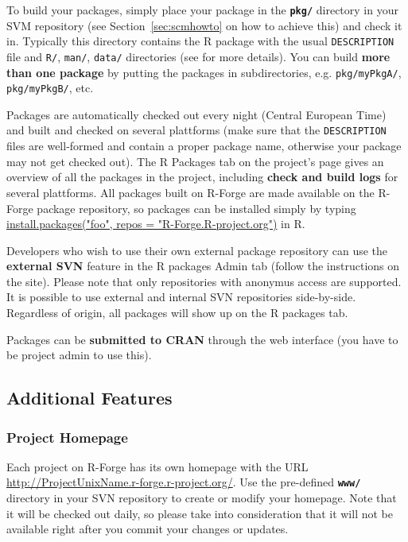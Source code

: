 \documentclass[a4paper]{article}
\begin{document}
To build your packages, simply place your package in the \textbf{\texttt{pkg/}} directory in your SVM repository (see
Section~\ref{sec:scmhowto} on how to achieve this) and check it
in. Typically this directory contains the R package with the usual
\texttt{DESCRIPTION} file and \texttt{R/}, \texttt{man/},
\texttt{data/} directories (see \cite{Rcore:writing_R_extensions} for more
details). You can build \textbf{more than one package} by putting the
packages in subdirectories, e.g. \texttt{pkg/myPkgA/},
\texttt{pkg/myPkgB/}, etc.

Packages are automatically checked out every night (Central European
Time) and built and checked on several plattforms (make sure that the
\texttt{DESCRIPTION} files are well-formed and contain a proper
package name, otherwise your package may not get checked out). The R Packages tab on the project's page gives an overview
of all the
packages in the project, including \textbf{check and build logs} for several
plattforms. All packages built on R-Forge are made available on the R-Forge package repository, so packages can be installed simply by typing \url{install.packages("foo", repos = "R-Forge.R-project.org")} in R.

Developers who wish to use their own external package repository can use the \textbf{external SVN} feature in the R packages Admin tab (follow the instructions on the site). Please note that only repositories with anonymus access are supported. It is possible to use external and internal SVN repositories side-by-side. Regardless of origin, all packages will show up on the R packages tab.

Packages can be \textbf{submitted to CRAN} through the web interface (you have to be project admin to use this).

\subsection{Additional Features}

\subsubsection{Project Homepage}
Each project on R-Forge has its own homepage with the URL \url{http://ProjectUnixName.r-forge.r-project.org/}. Use the pre-defined \textbf{\texttt{www/}} directory in your SVN repository to create or modify your homepage. Note that it will be checked out daily, so please take
into consideration that it will not be available right after you
commit your changes or updates. 
\end{document}

